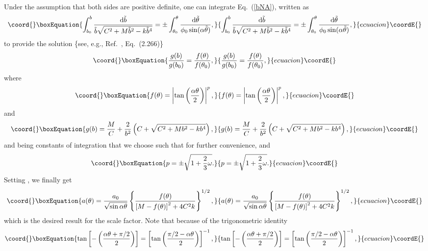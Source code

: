 \documentclass[a4paper,aps,twocolumn,prd,showpacs,nofootinbib]{revtex4}
\providecommand{\dd}{\mathrm{d}}
\begin{document}
Under the assumption that both sides are positive definite, one can
integrate Eq.~(\ref{bNA}), written as
\begin{equation}\coord{}\boxEquation{
\int_{b_0}^{b} {\dd \tilde b \over \tilde b \sqrt{C^2 + M \tilde b^2 -
k \tilde b^4}} = \pm \int_{\theta_0}^\theta {\dd \tilde \theta\over
\phi_0 \sin(\alpha\tilde \theta)}, \label{integr}
}{
\int_{b_0}^{b} {\dd \tilde b \over \tilde b \sqrt{C^2 + M \tilde b^2 -
k \tilde b^4}} = \pm \int_{\theta_0}^\theta {\dd \tilde \theta\over
\phi_0 \sin(\alpha\tilde \theta)}, }{ecuacion}\coordE{}\end{equation}
to provide the solution \{see, e.g., Ref.~\cite{Grad}, Eq.~(2.266)\}
\begin{equation}\coord{}\boxEquation{
{g(b)\over g(b_0)} = {f(\theta)\over f(\theta_0)},
}{
{g(b)\over g(b_0)} = {f(\theta)\over f(\theta_0)},
}{ecuacion}\coordE{}\end{equation}
where
\begin{equation}\coord{}\boxEquation{
f(\theta) = \left| \tan
\left(\frac{\alpha\theta}{2}\right)\right|^p,\label{fNA}
}{
f(\theta) = \left| \tan
\left(\frac{\alpha\theta}{2}\right)\right|^p,}{ecuacion}\coordE{}\end{equation}
and
\begin{equation}\coord{}\boxEquation{
g(b) = {M\over C} + {2\over b^2} \left( C+\sqrt{C^2 + M b^2
-kb^4}\right),
}{
g(b) = {M\over C} + {2\over b^2} \left( C+\sqrt{C^2 + M b^2
-kb^4}\right),
}{ecuacion}\coordE{}\end{equation}
\coordHE{} and \coordHE{} being constants of integration that we choose
such that \coordHE{} for further convenience, and
\begin{equation}\coord{}\boxEquation{
p = \pm \sqrt{1 + \frac{2}{3}\omega}.
}{
p = \pm \sqrt{1 + \frac{2}{3}\omega}.
}{ecuacion}\coordE{}\end{equation}
Setting \coordHE{}, we finally get
\begin{equation}\coord{}\boxEquation{
a(\theta) =
\frac{a_0}{\sqrt{\sin\alpha\theta}}\left\{\frac{f(\theta)}
{\left[M - f(\theta)\right]^2 + 4C^2k}\right\}^{1/2}\label{ana},
}{
a(\theta) =
\frac{a_0}{\sqrt{\sin\alpha\theta}}\left\{\frac{f(\theta)}
{\left[M - f(\theta)\right]^2 + 4C^2k}\right\}^{1/2},
}{ecuacion}\coordE{}\end{equation}
which is the desired result for the scale factor. Note that because
of the trigonometric identity
\begin{equation}\coord{}\boxEquation{
\tan \left[ -\left( {\alpha\theta +\pi/2\over 2}\right) \right] =
\left[ \tan \left( {\pi/2-\alpha\theta \over 2}\right) \right]^{-1},
}{
\tan \left[ -\left( {\alpha\theta +\pi/2\over 2}\right) \right] =
\left[ \tan \left( {\pi/2-\alpha\theta \over 2}\right) \right]^{-1},
}{ecuacion}\coordE{}\end{equation}
\end{document}
